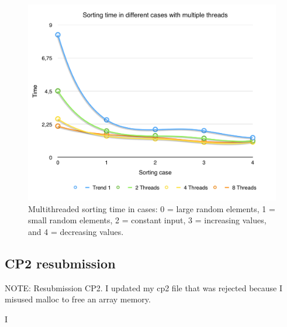 \documentclass[a4paper,10pt]{article}
\begin{document}
\begin{figure}[H]
\centering
\includegraphics[width=1\textwidth]{figures/w3_SortingTime}
\caption{Multithreaded sorting time in cases:  0 = large random elements, 1 = small random elements, 2 = constant input, 3 = increasing values, and 4 = decreasing values.}
\label{fig:pca_type}
\end{figure}

\subsection{CP2 resubmission}
NOTE: Resubmission CP2. I updated my cp2 file that was rejected because I misused malloc to free an array memory. 


I
\end{document}
